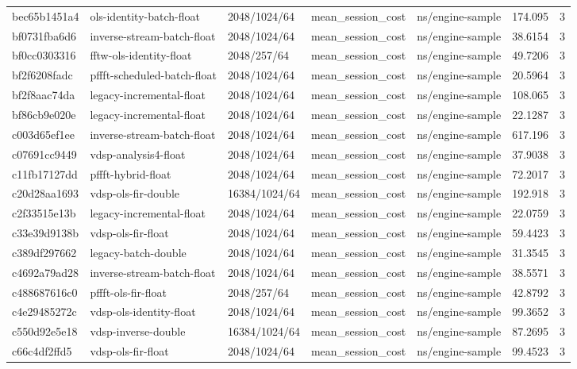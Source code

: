 \begin{longtable}{lllllrr}
bec65b1451a4 & ols-identity-batch-float & 2048/1024/64 & mean\_session\_cost & ns/engine-sample & 174.095 & 3 \\
bf0731fba6d6 & inverse-stream-batch-float & 2048/1024/64 & mean\_session\_cost & ns/engine-sample & 38.6154 & 3 \\
bf0cc0303316 & fftw-ols-identity-float & 2048/257/64 & mean\_session\_cost & ns/engine-sample & 49.7206 & 3 \\
bf2f6208fadc & pffft-scheduled-batch-float & 2048/1024/64 & mean\_session\_cost & ns/engine-sample & 20.5964 & 3 \\
bf2f8aac74da & legacy-incremental-float & 2048/1024/64 & mean\_session\_cost & ns/engine-sample & 108.065 & 3 \\
bf86cb9e020e & legacy-incremental-float & 2048/1024/64 & mean\_session\_cost & ns/engine-sample & 22.1287 & 3 \\
c003d65ef1ee & inverse-stream-batch-float & 2048/1024/64 & mean\_session\_cost & ns/engine-sample & 617.196 & 3 \\
c07691cc9449 & vdsp-analysis4-float & 2048/1024/64 & mean\_session\_cost & ns/engine-sample & 37.9038 & 3 \\
c11fb17127dd & pffft-hybrid-float & 2048/1024/64 & mean\_session\_cost & ns/engine-sample & 72.2017 & 3 \\
c20d28aa1693 & vdsp-ols-fir-double & 16384/1024/64 & mean\_session\_cost & ns/engine-sample & 192.918 & 3 \\
c2f33515e13b & legacy-incremental-float & 2048/1024/64 & mean\_session\_cost & ns/engine-sample & 22.0759 & 3 \\
c33e39d9138b & vdsp-ols-fir-float & 2048/1024/64 & mean\_session\_cost & ns/engine-sample & 59.4423 & 3 \\
c389df297662 & legacy-batch-double & 2048/1024/64 & mean\_session\_cost & ns/engine-sample & 31.3545 & 3 \\
c4692a79ad28 & inverse-stream-batch-float & 2048/1024/64 & mean\_session\_cost & ns/engine-sample & 38.5571 & 3 \\
c488687616c0 & pffft-ols-fir-float & 2048/257/64 & mean\_session\_cost & ns/engine-sample & 42.8792 & 3 \\
c4e29485272c & vdsp-ols-identity-float & 2048/1024/64 & mean\_session\_cost & ns/engine-sample & 99.3652 & 3 \\
c550d92e5e18 & vdsp-inverse-double & 16384/1024/64 & mean\_session\_cost & ns/engine-sample & 87.2695 & 3 \\
c66c4df2ffd5 & vdsp-ols-fir-float & 2048/1024/64 & mean\_session\_cost & ns/engine-sample & 99.4523 & 3 \\

\end{longtable}
